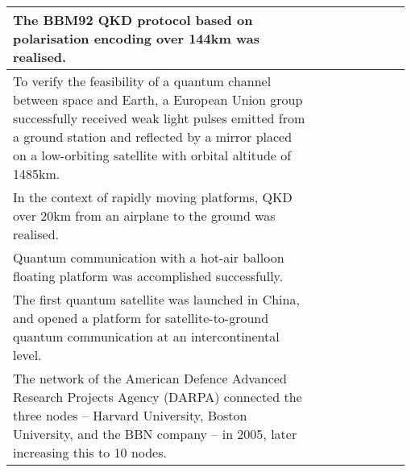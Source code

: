 \begin{table*}[!htbp]
\begin{tabular}{|p{0.755\linewidth}|p{0.22\linewidth}|}
	\hline
	The BBM92 QKD protocol based on polarisation encoding over 144km was realised.&\cite{bib:NP_3_481}\\
	\hline
	To verify the feasibility of a quantum channel between space and Earth, a European Union group successfully received weak light pulses emitted from a ground station and reflected by a mirror placed on a low-orbiting satellite with orbital altitude of 1485km.&\cite{bib:NJP_10_033038}\\
	\hline
	In the context of rapidly moving platforms,  QKD over 20km from an airplane to the ground was realised.&\cite{bib:NP_7_382}\\
	\hline
	Quantum communication with a hot-air balloon floating platform was accomplished successfully.&\cite{bib:NP_7_387}\\
	\hline
	The first quantum satellite was launched in China, and opened a platform for satellite-to-ground quantum communication at an intercontinental level. &\cite{bib:gibney2016one, bib:liao2017satellite, bib:yin2017satellite}\\
	\hline
The network of the American Defence Advanced Research Projects Agency (DARPA) connected the three nodes -- Harvard University, Boston University, and the BBN company -- in 2005, later increasing this to 10 nodes. &\cite{bib:QCC_2006_83}\\
\hline

\end{tabular}
\end{table*}
